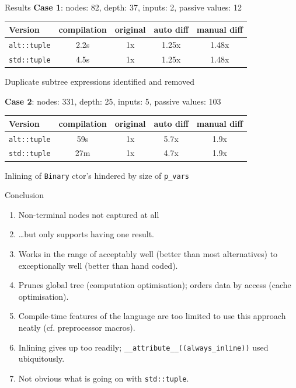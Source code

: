 \documentclass[xcolor=dvipsnames]{beamer}
\begin{document}
\begin{frame}[fragile]{Results}
\textbf{Case 1}: nodes: 82, depth: 37, inputs: 2, passive values: 12
\begin{table}
\begin{tabular}{l | c | c | c | c }
Version & compilation & original & auto diff & manual diff \\
\hline \hline
\texttt{alt::tuple} & 2.2s & 1x & 1.25x & 1.48x \\
\texttt{std::tuple} & 4.5s & 1x & 1.25x & 1.48x \\
\end{tabular}
\end{table}
\-\hspace{5mm} Duplicate subtree expressions identified and removed
\vspace{5mm}

\textbf{Case 2}: nodes: 331, depth: 25, inputs: 5, passive values: 103
\begin{table}
\begin{tabular}{l | c | c | c | c }
Version & compilation & original & auto diff & manual diff \\
\hline \hline
\texttt{alt::tuple} & 59s & 1x & 5.7x & 1.9x \\
\texttt{std::tuple} & 27m & 1x & 4.7x & 1.9x \\
\end{tabular}
\end{table}
\-\hspace{5mm} Inlining of \texttt{Binary} ctor's hindered by size of \texttt{p\_vars}
\end{frame}


\begin{frame}[fragile]{Conclusion}
  \begin{enumerate}
  \item Non-terminal nodes not captured at all \vspace{3mm}
  \item \ldots but only supports having one result. \vspace{3mm}
  \item Works in the range of acceptably well (better than most alternatives) to exceptionally well (better than hand coded). \vspace{3mm}
  \item Prunes global tree (computation optimisation); orders data by access (cache optimisation). \vspace{3mm}
  \item Compile-time features of the language are too limited to use this approach neatly (cf. preprocessor macros). \vspace{3mm}
  \item Inlining gives up too readily; \verb$__attribute__((always_inline))$ used ubiquitously. \vspace{3mm}
  \item Not obvious what is going on with \verb$std::tuple$. \vspace{3mm}
  \end{enumerate}
\end{frame}
\end{document}
